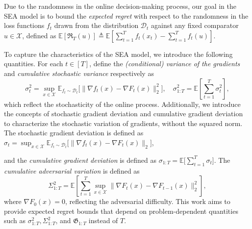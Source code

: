 \documentclass{article}
\theoremstyle{plain}
\theoremstyle{definition}
\theoremstyle{remark}
\newcommand{\cD}{\mathcal{D}}
\newcommand{\cX}{\mathcal{X}}
\renewcommand{\Bbb}{\mathbb}
\newcommand{\E}{{\Bbb E}}
\newcommand{\regret}{\mathfrak{R}}
\begin{document}
Due to the randomness in the online decision-making process, our goal in the SEA model is to bound the \emph{expected regret} with respect to the randomness in the loss functions $f_t$ drawn from the distribution $\cD_t$ against any fixed comparator $u \in \cX$, defined as $\E[\regret_T(u)] \triangleq \E[ \sum_{t=1}^T f_t(x_t) - \sum_{t=1}^T f_t(u)]$.

To capture the characteristics of the SEA model, we introduce the following quantities. For each $t \in [T]$, define the {\em (conditional) variance of the gradients} and {\em cumulative stochastic variance} respectively as 
\begin{equation} \label{eqn:variance:grad}
\sigma_{t}^2 = \sup_{x \in \cX} \E_{f_t \sim \cD_t}  \big[ \| \nabla f_t(x) - \nabla F_{t}(x) \|_2^2 \big],\quad \sigma_{1:T}^2 = \E \left[ \sum_{t=1}^T \sigma_t^2 \right],
\end{equation}
which reflect  the stochasticity of the online process. Additionally, we introduce the concepts of stochastic gradient deviation and cumulative gradient deviation to characterize the stochastic variation of gradients, without the squared norm. The stochastic gradient deviation is defined as $\sigma_{t} = \sup_{x \in \cX} \E_{f_t \sim \cD_t}  \big[ \| \nabla f_t(x) - \nabla F_{t}(x) \|_2 \big]$,

and the {\em cumulative gradient deviation} is defined as $\sigma_{1:T} = \E \big[ \sum_{t=1}^T \sigma_t \big]$.
The {\em cumulative adversarial variation} is defined as
\begin{equation*} 
\Sigma_{1:T}^2= \E \left[ \sum_{t=1}^T \sup_{x \in \cX} \|\nabla F_t(x)- \nabla F_{t-1}(x)\|_2^2\right],
\end{equation*}
where $\nabla F_0(x) = 0$, reflecting the adversarial difficulty. This work aims to provide expected regret bounds that depend on problem-dependent quantities such as $\sigma^2_{1:T}, \Sigma^2_{1:T}$, and $\mathfrak{G}_{1:T}$ instead of $T$.
\end{document}
